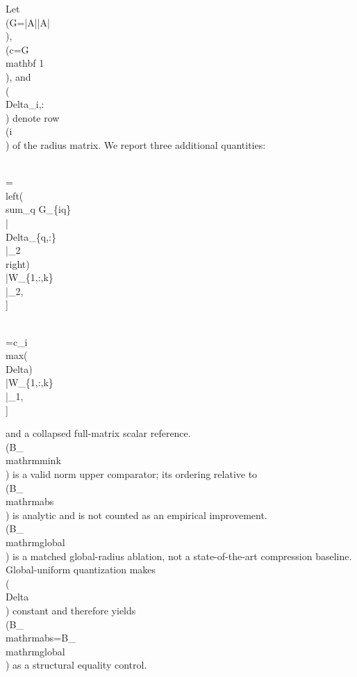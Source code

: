 \documentclass{article}
\begin{document}
\label{sec:comparators\_and\_numerical\_policy}

Let \\(G=|A||A|\\), \\(c=G\\mathbf 1\\), and \\(\\Delta_{i,:}\\) denote row \\(i\\) of the radius matrix. We report three additional quantities:

\\[
B\_\{\\mathrm{mink}\}[i,k]
=\\left(\\sum\_q G\_\{iq\}\\|\\Delta\_\{q,:\}\\|\_2\\right)\\|W\_\{1,:,k\}\\|\_2,
\\]

\\[
B\_\{\\mathrm{global}\}[i,k]
=c\_i\\max(\\Delta)\\|W\_\{1,:,k\}\\|\_1,
\\]

and a collapsed full-matrix scalar reference. \\(B_{\\mathrm{mink}}\\) is a valid norm upper comparator; its ordering relative to \\(B_{\\mathrm{abs}}\\) is analytic and is not counted as an empirical improvement. \\(B_{\\mathrm{global}}\\) is a matched global-radius ablation, not a state-of-the-art compression baseline. Global-uniform quantization makes \\(\\Delta\\) constant and therefore yields \\(B_{\\mathrm{abs}}=B_{\\mathrm{global}}\\) as a structural equality control.
\end{document}
